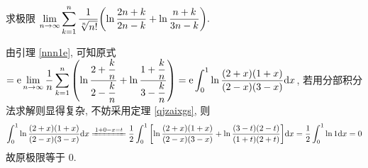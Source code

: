 \begin{example}
    求极限 $\displaystyle\lim_{n\to\infty}\sum_{k=1}^{n}\dfrac{1}{\sqrt[n]{n!}}\qty(\ln\dfrac{2n+k}{2n-k}+\ln\dfrac{n+k}{3n-k}).$
\end{example}
\begin{solution}
    由引理 \ref{nnn1e}, 可知原式 $\displaystyle=\mathrm{e}\lim_{n\to\infty}\dfrac{1}{n}\sum_{k=1}^{n}\qty(\ln\dfrac{2+\dfrac{k}{n}}{2-\dfrac{k}{n}}+\ln\dfrac{1+\dfrac{k}{n}}{3-\dfrac{k}{n}})=\mathrm{e}\int_{0}^{1}\ln\dfrac{(2+x)(1+x)}{(2-x)(3-x)}\dd x$,
    若用分部积分法求解则显得复杂, 不妨采用定理 \ref{qjzaixgs}, 则
    $$\int_{0}^{1}\ln\dfrac{(2+x)(1+x)}{(2-x)(3-x)}\dd x \xlongequal{1+0-x=t}\dfrac{1}{2}\int_{0}^{1}\qty[\ln\dfrac{(2+x)(1+x)}{(2-x)(3-x)}+\ln\dfrac{(3-t)(2-t)}{(1+t)(2+t)}]\dd x=\dfrac{1}{2}\int_{0}^{1}\ln 1\dd x=0$$
    故原极限等于 $0$.
\end{solution}


